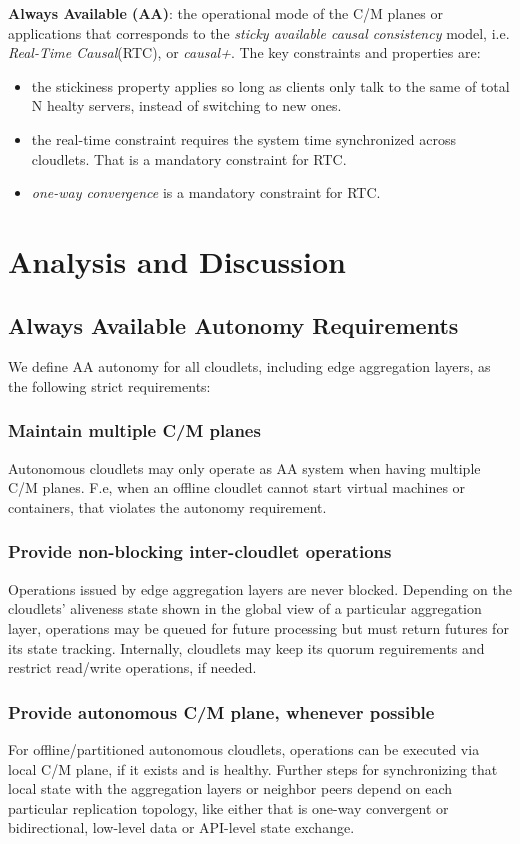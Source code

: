 \documentclass[conference]{IEEEtran}
\begin{document}
\textbf{Always Available (AA)}: the operational mode of the C/M planes or
applications that corresponds to the \textit{sticky available causal
consistency}\cite{b4} model, i.e. \textit{Real-Time Causal}(RTC)\cite{b2}, or
\textit{causal+}\cite{b1}. The key constraints and properties are:
\begin{itemize}
  \item the stickiness property applies so long as clients only talk to the
    same of total $\mathrm{N}$ healty servers, instead of switching to new
    ones.
  \item the real-time constraint requires the system time synchronized across
    cloudlets. That is a mandatory constraint for RTC.
  \item \textit{one-way convergence}\cite{b2} is a mandatory constraint for
    RTC.
\end{itemize}

\section{Analysis and Discussion}
\subsection{Always Available Autonomy Requirements}
We define AA autonomy for all cloudlets, including edge aggregation layers, as
the following strict requirements:

\subsubsection{Maintain multiple C/M planes}
Autonomous cloudlets may only operate as AA system when having multiple
C/M planes. F.e, when an offline cloudlet cannot start virtual machines
or containers, that violates the autonomy requirement.

\subsubsection{Provide non-blocking inter-cloudlet operations}
Operations issued by edge aggregation layers are never blocked. Depending on
the cloudlets' aliveness state shown in the global view of a particular
aggregation layer, operations may be queued for future processing but must
return futures for its state tracking. Internally, cloudlets may keep its
quorum reguirements and restrict read/write operations, if needed.

\subsubsection{Provide autonomous C/M plane, whenever possible}
For offline/partitioned autonomous cloudlets, operations can be executed via
local C/M plane, if it exists and is healthy. Further steps for synchronizing
that local state with the aggregation layers or neighbor peers depend on each
particular replication topology, like either that is one-way convergent or
bidirectional, low-level data or API-level state exchange.
\end{document}
